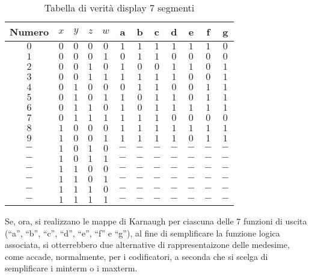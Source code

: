 \documentclass[a4paper]{extarticle}
\newcommand{\quotes}[1]{``#1''}
\renewcommand\arraystretch{}
\begin{document}
\begin{table}[H]
    \centering
    \setlength{\tabcolsep}{8pt}
    \renewcommand{\arraystretch}{1.1}
    \begin{tabular}{c|cccc|ccccccc}
         Numero & $x$ & $y$ & $z$ & $w$ & a & b & c & d & e & f & g\\
         \hline
         $0$ & $0$ & $0$ & $0$ & $0$ & $1$ & $1$ & $1$ & $1$ & $1$ & $1$ & $0$\\
         $1$ & $0$ & $0$ & $0$ & $1$ & $0$ & $1$ & $1$ & $0$ & $0$ & $0$ & $0$ \\
         $2$ & $0$ & $0$ & $1$ & $0$ & $1$ & $0$ & $0$ & $1$ & $1$ & $0$ & $1$ \\
         $3$ & $0$ & $0$ & $1$ & $1$ & $1$ & $1$ & $1$ & $1$ & $0$ & $0$ & $1$ \\
         \hline
         $4$ & $0$ & $1$ & $0$ & $0$ & $0$ & $1$ & $1$ & $0$ & $0$ & $1$ & $1$ \\
         $5$ & $0$ & $1$ & $0$ & $1$ & $1$ & $0$ & $1$ & $1$ & $0$ & $1$ & $1$ \\
         $6$ & $0$ & $1$ & $1$ & $0$ & $1$ & $0$ & $1$ & $1$ & $1$ & $1$ & $1$ \\
         $7$ & $0$ & $1$ & $1$ & $1$ & $1$ & $1$ & $1$ & $0$ & $0$ & $0$ & $0$ \\
         \hline
         $8$ & $1$ & $0$ & $0$ & $0$ & $1$ & $1$ & $1$ & $1$ & $1$ & $1$ & $1$\\
         $9$ & $1$ & $0$ & $0$ & $1$ & $1$ & $1$ & $1$ & $1$ & $0$ & $1$ & $1$\\
         $-$ & $1$ & $0$ & $1$ & $0$ & $-$ & $-$ & $-$ & $-$ & $-$ & $-$ & $-$ \\
         $-$ & $1$ & $0$ & $1$ & $1$ & $-$ & $-$ & $-$ & $-$ & $-$ & $-$ & $-$ \\
         \hline
         $-$ & $1$ & $1$ & $0$ & $0$ & $-$ & $-$ & $-$ & $-$ & $-$ & $-$ & $-$ \\
         $-$ & $1$ & $1$ & $0$ & $1$ & $-$ & $-$ & $-$ & $-$ & $-$ & $-$ & $-$ \\
         $-$ & $1$ & $1$ & $1$ & $0$ & $-$ & $-$ & $-$ & $-$ & $-$ & $-$ & $-$ \\
         $-$ & $1$ & $1$ & $1$ & $1$ & $-$ & $-$ & $-$ & $-$ & $-$ & $-$ & $-$ \\
    \end{tabular}
    \caption{Tabella di verità display \(7\) segmenti}
    \label{tab:tabella_verita_display_7_segmenti}
\end{table}

\noindent
Se, ora, si realizzano le mappe di Karnaugh per ciascuna delle \(7\) funzioni di uscita (\quotes{a}, \quotes{b}, \quotes{c}, \quotes{d}, \quotes{e}, \quotes{f} e \quotes{g}), al fine di semplificare la funzione logica associata, si otterrebbero due alternative di rappresentaizone delle medesime, come accade, normalmente, per i codificatori, a seconda che si scelga di semplificare i minterm o i maxterm.
\end{document}
